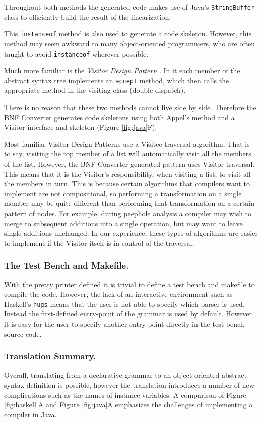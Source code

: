 \documentclass{llncs}
\newcommand{\shortsection}[1]{\subsubsection*{#1.}} %
\begin{document}
Throughout both methods the generated code makes use of Java's \texttt{StringBuffer} class to efficiently build the result of the linearization.

This \texttt{instanceof} method is also used to generate a code skeleton. However, this method may seem awkward to many object-oriented programmers, who are often taught to avoid \texttt{instanceof} wherever possible.

Much more familiar is the \textit{Visitor Design Pattern} \cite{visitor}. In it each member of the abstract syntax tree implements an \texttt{accept} method, which then calls the appropriate method in the visiting class (double-dispatch).

There is no reason that these two methods cannot live side by side. Therefore the BNF Converter generates code skeletons using both Appel's method and a Visitor interface and skeleton (Figure \ref{fig:java}F).

Most familiar Visitor Design Patterns use a Visitee-traversal algorithm. That is to say, visiting the top member of a list will automatically visit all the members of the list. However, the BNF Converter-generated pattern uses Visitor-traversal. This means that it is the Visitor's responsibility, when visiting a list, to visit all the members in turn. This is because certain algorithms that compilers want to implement are not compositional, so performing a transformation on a single member may be quite different than performing that transformation on a certain pattern of nodes. For example, during peephole analysis a compiler may wish to merge to subsequent additions into a single operation, but may want to leave single additions unchanged. In our experience, these types of algorithms are easier to implement if the Visitor itself is in control of the traversal.

\shortsection{The Test Bench and Makefile}

With the pretty printer defined it is trivial to define a test bench and makefile to compile the code. However, the lack of an interactive environment such as Haskell's \texttt{hugs} means that the user is not able to specify which parser is used. Instead the first-defined entry-point of the grammar is used by default. However it is easy for the user to specify another entry point directly in the test bench source code.

\shortsection{Translation Summary}

Overall, translating from a declarative grammar to an object-oriented 
abstract syntax definition is possible, however the translation introduces a number of new complications such as the names of instance variables. A comparison of Figure \ref{fig:haskell}A and Figure \ref{fig:java}A emphasizes the challenges of implementing a compiler in Java.
 
\end{document}
